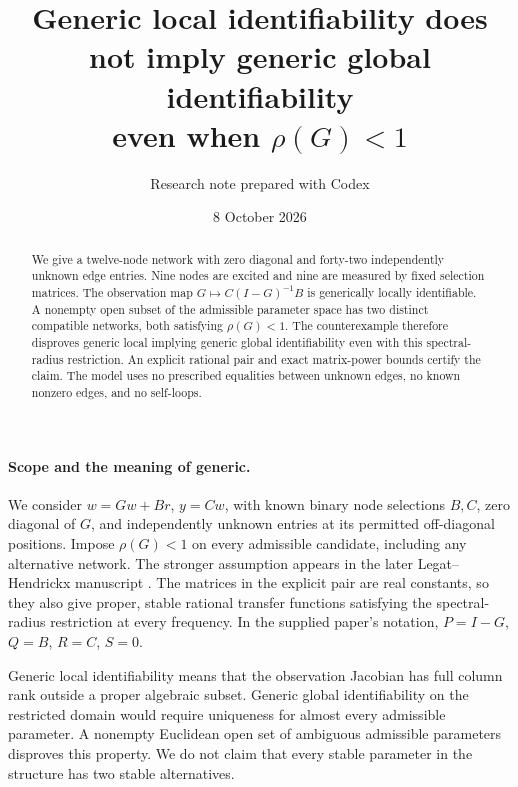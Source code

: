 \documentclass[11pt,a4paper]{article}
\title{Generic local identifiability does not imply generic global identifiability\texorpdfstring{\\}{ }even when $\rho(G)<1$}
\author{Research note prepared with Codex}
\date{8 October 2026}
\begin{document}
\maketitle
\begin{abstract}
We give a twelve-node network with zero diagonal and forty-two independently
unknown edge entries. Nine nodes are excited and nine are measured by fixed
selection matrices. The observation map $G\mapsto C(I-G)^{-1}B$ is generically
locally identifiable. A nonempty open subset of the admissible parameter
space has two distinct compatible networks, both satisfying $\rho(G)<1$.
The counterexample therefore disproves generic local implying generic global
identifiability even with this spectral-radius restriction. An explicit
rational pair and exact matrix-power bounds certify the claim. The model
uses no prescribed equalities between unknown edges, no known nonzero
edges, and no self-loops.
\end{abstract}

\paragraph{Scope and the meaning of generic.}
We consider $w=Gw+Br$, $y=Cw$, with known binary node selections $B,C$,
zero diagonal of $G$, and independently unknown entries at its permitted
off-diagonal positions. Impose $\rho(G)<1$ on every admissible candidate,
including any alternative network. The stronger assumption appears in
the later Legat--Hendrickx manuscript \cite{LH24}.
The matrices in the explicit pair are real constants, so they also give
proper, stable rational transfer functions satisfying the spectral-radius
restriction at every frequency. In the supplied paper's notation,
$P=I-G$, $Q=B$, $R=C$, $S=0$.

Generic local identifiability means that the observation Jacobian has full
column rank outside a proper algebraic subset. Generic global identifiability
on the restricted domain would require uniqueness for almost every
admissible parameter. A nonempty Euclidean open set of ambiguous admissible
parameters disproves this property. We do not claim that every stable
parameter in the structure has two stable alternatives.
\end{document}
